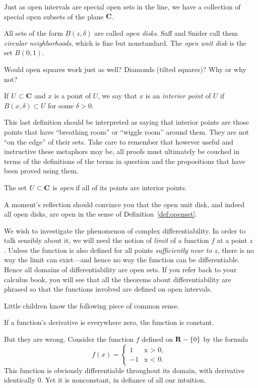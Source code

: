 \documentclass[twocolumn,12pt]{article}
\begin{document}
Just as open intervals are special open sets in the line, we have a collection of special open subsets of the plane $\mathbf{C}$.
\begin{definition} \label{def:opendisk}
    All sets of the form $B(z, \delta)$ are called \emph{open disks}. Saff and Snider call them \emph{circular neighborhoods}, which is fine but nonstandard. The \emph{open unit disk} is the set $B(0, 1)$.
\end{definition}
\begin{koan}
    Would open squares work just as well? Diamonds (tilted squares)? Why or why not?
\end{koan}
\begin{definition} \label{def:interiorpoint}
    If $U \subset \mathbf{C}$ and $x$ is a point of $U$, we say that $x$ is an \emph{interior point} of $U$ if $B(x, \delta) \subset U$ for some $\delta > 0$.
\end{definition}
This last definition should be interpreted as saying that interior points are those points that have ``breathing room'' or ``wiggle room'' around them. They are not ``on the edge'' of their sets. Take care to remember that however useful and instructive these metaphors may be, all proofs must ultimately be couched in terms of the definitions of the terms in question and the propositions that have been proved using them.
\begin{definition} \label{def:openset}
    The set $U \subset \mathbf{C}$ is \emph{open} if all of its points are interior points.
\end{definition}
A moment's reflection should convince you that the open unit disk, and indeed all open disks, are open in the sense of Definition~\ref{def:openset}.

We wish to investigate the phenomenon of complex differentiability. In order to talk sensibly about it, we will need the notion of \emph{limit} of a function $f$ at a point $z$. Unless the function is also defined for all points \emph{sufficiently near to $z$}, there is no way the limit can exist---and hence no way the function can be differentiable. Hence all domains of differentiability are open sets. If you refer back to your calculus book, you will see that all the theorems about differentiability are phrased so that the functions involved are defined on open intervals.

Little children know the following piece of common sense.
\begin{fact} \label{fact:derzeroconstant}
    If a function's derivative is everywhere zero, the function is constant.
\end{fact}
But they are wrong. Consider the function $f$ defined on $\mathbf{R} - \{0\}$ by the formula
\[
    f(x) = \begin{cases}
        1 & \text{x > 0,} \\
        -1 & \text{x < 0}.
    \end{cases}
\]
This function is obviously differentiable throughout its domain, with derivative identically 0. Yet it is nonconstant, in defiance of all our intuition.
\end{document}
